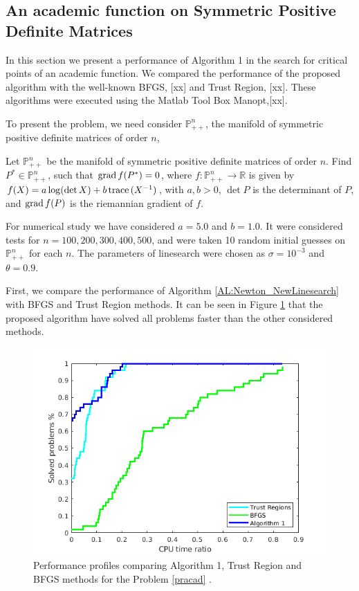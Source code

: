 \subsection{An academic function on Symmetric Positive Definite Matrices }

In this section we present a performance of Algorithm 1 in the search for critical points of an academic function. We compared the performance of the proposed algorithm with the well-known BFGS, [xx] and Trust Region, [xx]. These algorithms were executed using the Matlab Tool Box Manopt,[xx].

 To present the problem, we need consider  $ \mathbb{P}^n_{++}$, the manifold of symmetric positive definite matrices of order $n$,

\begin{problem}\label{pracad} Let $ \mathbb{P}^n_{++}$ be the manifold of symmetric positive definite matrices of order $n$.  Find $P^* \in \mathbb{P}^n_{++}$, such that $\operatorname{grad} f(P^*) =0$, where $f:\mathbb{P}^n_{++} \to \mathbb{R}$ is given by  $f(X) = a \log(\det X) + b \,\mbox{trace}\, (X^{-1})$, with $a,b > 0$, $\det P$ is the determinant of $P$,   and $\operatorname{grad} f(P)$ is the riemannian gradient of $f$.
\end{problem}


For numerical study we have considered $a = 5.0$ and $b = 1.0$. It were considered tests for  $n=100,200,300,400,500$, and were taken 10 random initial guesses on $\mathbb{P}^n_{++}$ for each $n$. The parameters of linesearch were chosen as $\sigma = 10^{-3}$ and $\theta = 0.9$.

First, we compare the performance of Algorithm \ref{AL:Newton_NewLinesearch} with BFGS and Trust Region methods. It can be seen in Figure \ref{fig:logdetperformance} that the proposed algorithm have solved all problems faster than the other considered methods.


\begin{figure}
	\centering
	\includegraphics[scale=0.5]{logdetpp.png}
	\caption{Performance profiles comparing Algorithm 1, Trust Region and BFGS methods for the Problem \ref{pracad} .}
	\label{fig:logdetperformance}
\end{figure}

